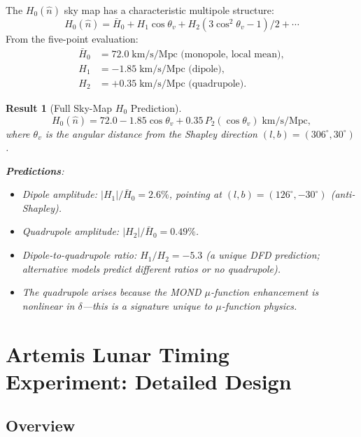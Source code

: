 \documentclass[aps,prd,twocolumn,superscriptaddress]{revtex4-2}
\newtheorem{result}{Result}
\begin{document}
The $H_0(\hat{n})$ sky map has a characteristic multipole structure:
\begin{equation}
H_0(\hat{n}) = \bar{H}_0 + H_1\cos\theta_v
+ H_2(3\cos^2\theta_v - 1)/2 + \cdots
\end{equation}
From the five-point evaluation:
\begin{align}
\bar{H}_0 &= 72.0\;\text{km/s/Mpc (monopole, local mean)},\\
H_1 &= -1.85\;\text{km/s/Mpc (dipole)},\\
H_2 &= +0.35\;\text{km/s/Mpc (quadrupole)}.
\end{align}

\begin{result}[Full Sky-Map $H_0$ Prediction]
\label{res:sky-map}
\begin{equation}
\boxed{
H_0(\hat{n}) = 72.0 - 1.85\cos\theta_v
+ 0.35\,P_2(\cos\theta_v)\;\text{km/s/Mpc},
}
\label{eq:H0-multipole}
\end{equation}
where $\theta_v$ is the angular distance from the Shapley direction
$(l,b) = (306^\circ, 30^\circ)$.

\textbf{Predictions}:
\begin{itemize}
\item Dipole amplitude: $|H_1|/\bar{H}_0 = 2.6\%$, pointing at
$(l,b) = (126^\circ, -30^\circ)$ (anti-Shapley).
\item Quadrupole amplitude: $|H_2|/\bar{H}_0 = 0.49\%$.
\item Dipole-to-quadrupole ratio: $H_1/H_2 = -5.3$ (a unique DFD
prediction; alternative models predict different ratios or no quadrupole).
\item The quadrupole arises because the MOND $\mu$-function
enhancement is \emph{nonlinear} in $\delta$---this is a signature
unique to $\mu$-function physics.
\end{itemize}
\end{result}


\section{Artemis Lunar Timing Experiment: Detailed Design}
\label{sec:Artemis}

\subsection{Overview}
\end{document}
